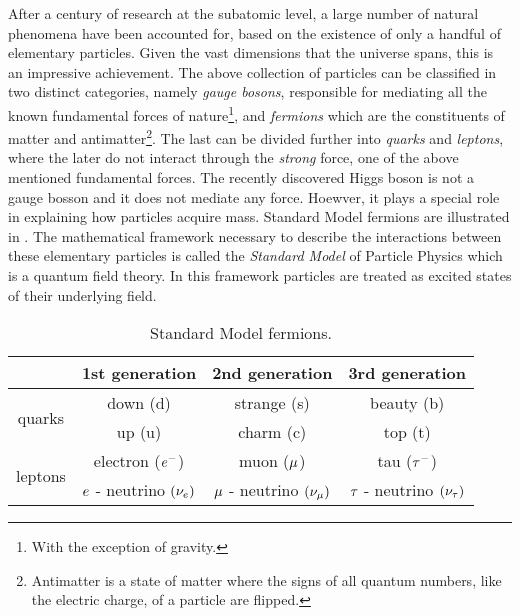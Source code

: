After a century of research at the subatomic level, a large number of natural phenomena have been accounted
for, based on the existence of only a handful of elementary particles. Given the vast dimensions that the
universe spans, this is an impressive achievement. The above collection of particles can be classified
in two distinct categories, namely {\it gauge bosons}, responsible for mediating all the known fundamental
forces of nature\footnote{With the exception of gravity.}, and {\it fermions} which are the constituents
of matter and antimatter\footnote{Antimatter is a state of matter where the signs of all quantum numbers,
like the electric charge, of a particle are flipped.}. The last can be divided further into {\it quarks}
and {\it leptons}, where the later do not interact through the {\it strong} force, one of the above mentioned
fundamental forces. The recently discovered Higgs boson\cite{higgs-cms,higgs-atlas} is not a gauge bosson and
it does not mediate any force. Hoewver, it plays a special role in explaining how particles acquire mass.
Standard Model fermions are illustrated in . The mathematical framework necessary to
describe the interactions between these elementary particles is called the \textit{Standard Model} of Particle
Physics\cite{sm-glashow,sm-weinberg,sm-salam} which is a quantum field theory. In this framework particles are
treated as excited states of their underlying field.


\begin{table}[h!]
  \centering
 \begin{tabular}{cccc}
   \hline
                            &  1st generation                     &   2nd generation              &  3rd generation    \\
   \hline
   \multirow{2}{*}{quarks}  &  down (d)                           &   strange (s)                 &  beauty (b)        \\
                            &  up (u)                             &   charm (c)                   &  top (t)           \\
   \hline
   \multirow{2}{*}{leptons} &   electron ($e^-$)                  &   muon ($\mu$)               &  tau ($\tau^-$)     \\
                            &   $e$ - neutrino $(\nu_e)$  &  $\mu$ - neutrino $(\nu_\mu)$  &  $\tau$ - neutrino $(\nu_\tau)$  \\
   \hline
 \end{tabular}
 \caption{Standard Model fermions.}
 \label{quarksLeptons}
\end{table}

